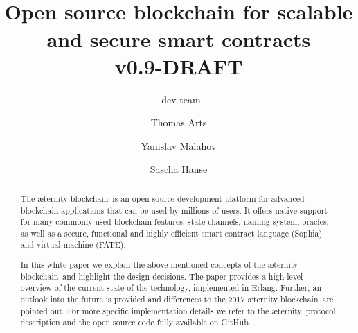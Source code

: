 \documentclass{article}
\title{\huge \Aet\  \\[0.5em] \large Open source blockchain for
scalable and secure smart contracts  \\[1em] v0.9-DRAFT }
\author{\aet\ dev team  \and Thomas Arts \and
             Yanislav Malahov \and Sascha Hanse}
\newcommand{\blockchain}{{\ae}ternity blockchain}
\newcommand{\aet}{{\ae}ternity}
\begin{document}
\maketitle


%
\begin{abstract}
The \blockchain\ is an open source development platform for advanced blockchain
applications that can be used by millions of users.
It offers native support for many commonly used
blockchain features: state channels, naming system, oracles, as well as a
secure, functional and highly efficient smart contract language (Sophia) and
virtual machine (FATE).

In this white paper we explain the above mentioned concepts of the
\blockchain\ and highlight the design decisions. The
paper provides a high-level overview of the current state of the
technology, implemented in Erlang. Further, an outlook into the future is provided and differences
to the 2017 \blockchain\ are pointed out. For more specific implementation
details we refer to the \aet\ protocol description
and the open source code fully available on GitHub.

\end{abstract}


\newpage

\tableofcontents

\newpage








 
\end{document}
